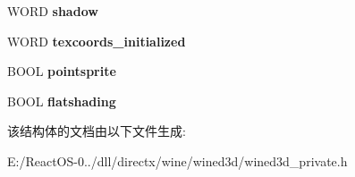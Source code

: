 \begin{DoxyCompactItemize}
W\+O\+RD {\bfseries shadow}
\item 
\mbox{\label{structps__compile__args_a47717b39517ad714208422a1104299d4}} 
W\+O\+RD {\bfseries texcoords\+\_\+initialized}
\item 
\mbox{\label{structps__compile__args_afe227a4f9fe3be54525238542de0474c}} 
B\+O\+OL {\bfseries pointsprite}
\item 
\mbox{\label{structps__compile__args_aa3702b8c0437bbea992de92214c63867}} 
B\+O\+OL {\bfseries flatshading}
\end{DoxyCompactItemize}


该结构体的文档由以下文件生成\+:\begin{DoxyCompactItemize}
\item 
E\+:/\+React\+O\+S-\/0../dll/directx/wine/wined3d/wined3d\+\_\+private.\+h\end{DoxyCompactItemize}
